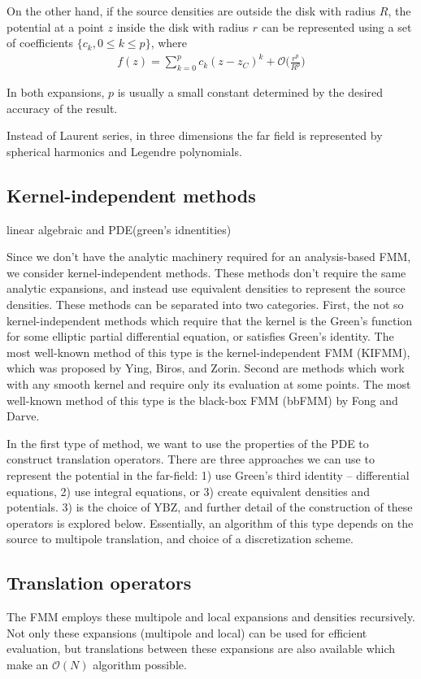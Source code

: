 \documentclass[11pt, oneside]{article}   	%
\begin{document}
On the other hand, if the source densities are outside the disk with radius $R$, the potential at a point $z$ inside the disk with radius $r$ can be represented using a set of coefficients $\{c_k, 0\le k\le p\}$, where
\begin{align}
f(z)=\sum_{k=0}^pc_k(z-z_C)^k+\mathcal{O}\bigg(\frac{r^p}{R^p}\bigg)
\end{align}

In both expansions, $p$ is usually a small constant determined by the desired accuracy of the result.

Instead of Laurent series, in three dimensions the far field is represented by spherical harmonics and Legendre polynomials.

\subsection{Kernel-independent methods}

linear algebraic and PDE(green's idnentities)

Since we don't have the analytic machinery required for an analysis-based FMM, we consider kernel-independent methods. These methods don't require the same analytic expansions, and instead use equivalent densities to represent the source densities. These methods can be separated into two categories. First, the not so kernel-independent methods which require that the kernel is the Green's function for some elliptic partial differential equation, or satisfies Green's identity. The most well-known method of this type is the kernel-independent FMM (KIFMM), which was proposed by Ying, Biros, and Zorin. Second are methods which work with any smooth kernel and require only its evaluation at some points. The most well-known method of this type is the black-box FMM (bbFMM) by Fong and Darve.

In the first type of method, we want to use the properties of the PDE to construct translation operators. There are three approaches we can use to represent the potential in the far-field: 1) use Green's third identity -- differential equations, 2) use integral equations, or 3) create equivalent densities and potentials. 3) is the choice of YBZ, and further detail of the construction of these operators is explored below. Essentially, an algorithm of this type depends on the source to multipole translation, and choice of a discretization scheme.

\subsection{Translation operators}
The FMM employs these multipole and local expansions and densities recursively. Not only these expansions (multipole and local) can be used for efficient evaluation, but translations between these expansions are also available which make an $\mathcal{O}(N)$ algorithm possible.
\end{document}
